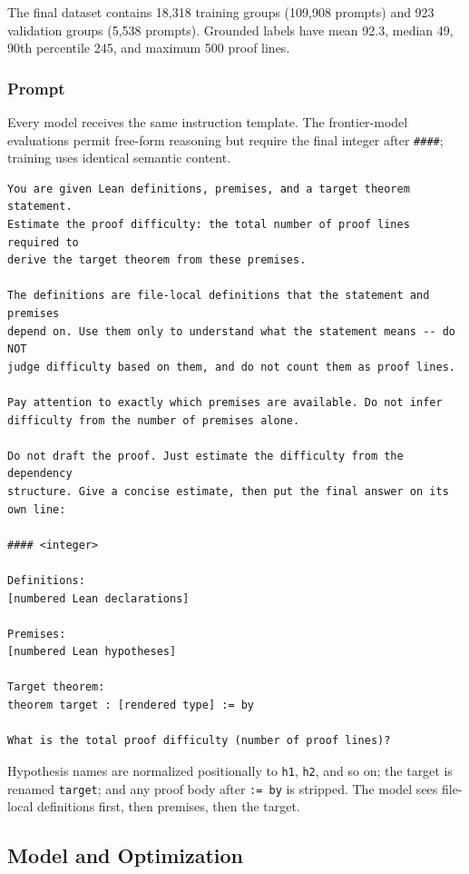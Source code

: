 The final dataset contains 18,318 training groups (109,908 prompts) and 923
validation groups (5,538 prompts).  Grounded labels have mean 92.3, median 49,
90th percentile 245, and maximum 500 proof lines.  

\subsubsection{Prompt}

Every model receives the same instruction template.  The frontier-model
evaluations permit free-form reasoning but require the final integer after
\texttt{\#\#\#\#}; training uses identical semantic content.

\begin{lstlisting}[basicstyle=\ttfamily\footnotesize,frame=single]
You are given Lean definitions, premises, and a target theorem statement.
Estimate the proof difficulty: the total number of proof lines required to
derive the target theorem from these premises.

The definitions are file-local definitions that the statement and premises
depend on. Use them only to understand what the statement means -- do NOT
judge difficulty based on them, and do not count them as proof lines.

Pay attention to exactly which premises are available. Do not infer
difficulty from the number of premises alone.

Do not draft the proof. Just estimate the difficulty from the dependency
structure. Give a concise estimate, then put the final answer on its own line:

#### <integer>

Definitions:
[numbered Lean declarations]

Premises:
[numbered Lean hypotheses]

Target theorem:
theorem target : [rendered type] := by

What is the total proof difficulty (number of proof lines)?
\end{lstlisting}

Hypothesis names are normalized positionally to \texttt{h1}, \texttt{h2}, and so
on; the target is renamed \texttt{target}; and any proof body after
\texttt{:= by} is stripped.  The model sees file-local definitions first, then
premises, then the target.

\subsection{Model and Optimization}
\label{app:optimization}

